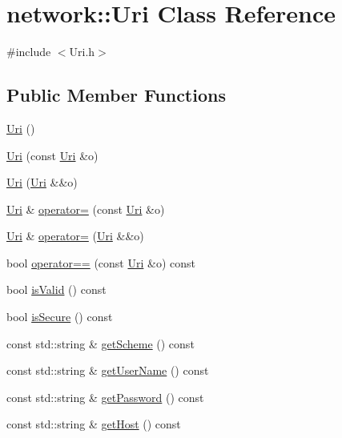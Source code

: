 \hypertarget{classnetwork_1_1Uri}{}\section{network\+:\+:Uri Class Reference}
\label{classnetwork_1_1Uri}


{\ttfamily \#include $<$Uri.\+h$>$}

\subsection*{Public Member Functions}
\begin{DoxyCompactItemize}
\item 
\hyperlink{classnetwork_1_1Uri_a09bf538373af150b9a766ab0b4773b73}{Uri} ()
\item 
\hyperlink{classnetwork_1_1Uri_a6895784a1ca3d1b1ebe88767f19bf980}{Uri} (const \hyperlink{classnetwork_1_1Uri}{Uri} \&o)
\item 
\hyperlink{classnetwork_1_1Uri_a8f0a8044622be7de3a491f57c1c64aba}{Uri} (\hyperlink{classnetwork_1_1Uri}{Uri} \&\&o)
\item 
\hyperlink{classnetwork_1_1Uri}{Uri} \& \hyperlink{classnetwork_1_1Uri_ad0369ecf750e62f5545d72c029cf40bd}{operator=} (const \hyperlink{classnetwork_1_1Uri}{Uri} \&o)
\item 
\hyperlink{classnetwork_1_1Uri}{Uri} \& \hyperlink{classnetwork_1_1Uri_a16082f62818caf56de97e9f644427389}{operator=} (\hyperlink{classnetwork_1_1Uri}{Uri} \&\&o)
\item 
bool \hyperlink{classnetwork_1_1Uri_af23c8de7b1b1f8b4a81f28e22d8087ff}{operator==} (const \hyperlink{classnetwork_1_1Uri}{Uri} \&o) const
\item 
bool \hyperlink{classnetwork_1_1Uri_af3170f810ad98c899b904d8c44b4123d}{is\+Valid} () const
\item 
bool \hyperlink{classnetwork_1_1Uri_ad7451b6cd34c82b84d105b10e65c7283}{is\+Secure} () const
\item 
const std\+::string \& \hyperlink{classnetwork_1_1Uri_a6cb9e0fbc51e0478dbd6968b0092b032}{get\+Scheme} () const
\item 
const std\+::string \& \hyperlink{classnetwork_1_1Uri_aaa484dfe8e72c3595889a9b95eaffc6c}{get\+User\+Name} () const
\item 
const std\+::string \& \hyperlink{classnetwork_1_1Uri_abfc199447ca8d6b4e19c079aee388585}{get\+Password} () const
\item 
const std\+::string \& \hyperlink{classnetwork_1_1Uri_a993f91088a1d761721398970c206068d}{get\+Host} () const

\end{DoxyCompactItemize}
